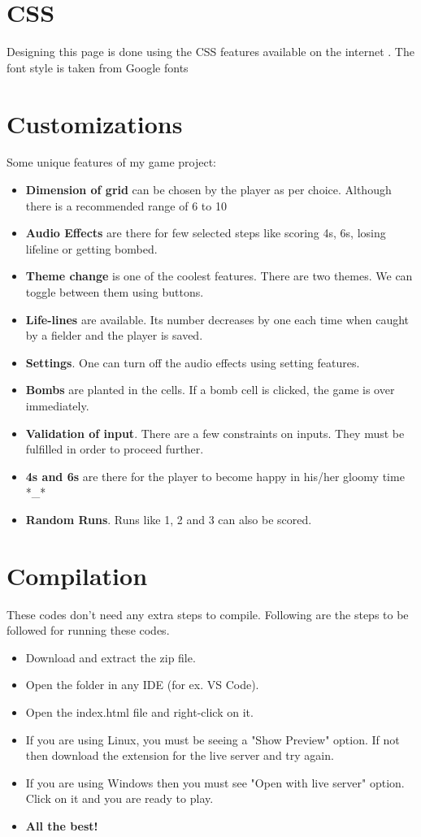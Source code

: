 \documentclass{article}
\begin{document}
\section{CSS}
Designing this page is done using the CSS features available on the internet \cite{css:latex}. The font style \cite{font:latex} is taken from Google fonts

\section{Customizations}
Some unique features of my game project:
\begin{itemize}
    \item \textbf{Dimension of grid} can be chosen by the player as per choice. Although there is a recommended range of 6 to 10
    \item \textbf{Audio Effects} are there for few selected steps like scoring 4s, 6s, losing lifeline or getting bombed.
    \item \textbf{Theme change} is one of the coolest features. There are two themes. We can toggle between them using buttons.
    \item \textbf{Life-lines} are available. Its number decreases by one each time when caught by a fielder and the player is saved.
    \item \textbf{Settings}. One can turn off the audio effects using setting features.
    \item \textbf{Bombs} are planted in the cells. If a bomb cell is clicked, the game is over immediately.
    \item \textbf{Validation of input}. There are a few constraints on inputs. They must be fulfilled in order to proceed further.
    \item \textbf{4s and 6s} are there for the player to become happy in his/her gloomy time *\_*
    \item \textbf{Random Runs}. Runs like 1, 2 and 3 can also be scored.
    \end{itemize}
\section{Compilation}
These codes don't need any extra steps to compile. Following are the steps to be followed for running these codes.
\begin{itemize}
    \item Download and extract the zip file.
    \item Open the folder in any IDE (for ex. VS Code).
    \item Open the index.html file and right-click on it. 
    \item If you are using Linux, you must be seeing a "Show Preview" option. If not then download the extension for the live server and try again.
    \item If you are using Windows then you must see "Open with live server" option. Click on it and you are ready to play.
    \item \textbf{All the best!}
\end{itemize}
    



\end{document}
